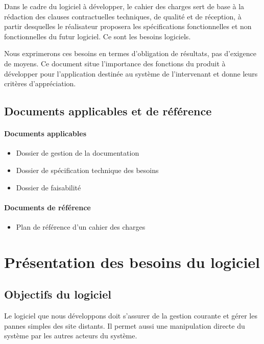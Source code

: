\documentclass[a4paper, 11pt, final]{article}
\begin{document}
Dans le cadre du logiciel à développer, le cahier des charges sert de base à la rédaction des clauses contractuelles techniques, de qualité et de réception, à partir desquelles le réalisateur proposera les spécifications fonctionnelles et non fonctionnelles du futur logiciel. Ce sont les besoins logiciels.


Nous exprimerons ces besoins en termes d'obligation de résultats, pas d'exigence de moyens. Ce document situe l'importance des fonctions du produit à développer pour l'application destinée au système de l'intervenant et donne leurs critères d'appréciation.


\subsection{Documents applicables et de référence}
\paragraph{Documents applicables}
\begin{itemize}
\item Dossier de gestion de la documentation
\item Dossier de spécification technique des besoins
\item Dossier de faisabilité
\end{itemize}

\paragraph{Documents de référence}
\begin{itemize}
\item Plan de référence d'un cahier des charges
\end{itemize}


\section{Présentation des besoins du logiciel}



\subsection{Objectifs du logiciel}
Le logiciel que nous développons doit s'assurer de la gestion courante et gérer les pannes simples des site distants. Il permet aussi une manipulation directe du système par les autres acteurs du système.
\end{document}
